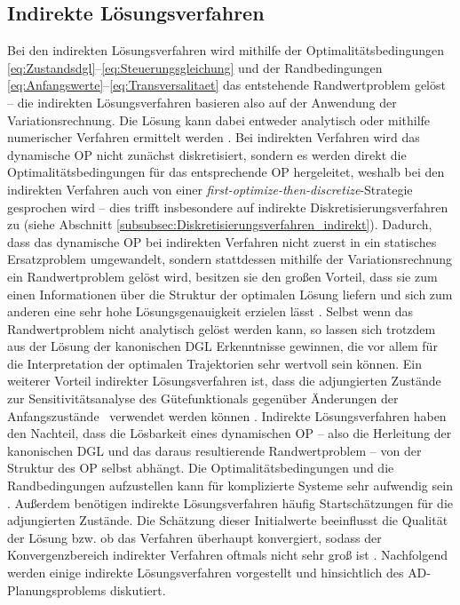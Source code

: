 \subsection{Indirekte Lösungsverfahren}\label{subsec:Indirekt}
Bei den indirekten Lösungsverfahren wird mithilfe der Optimalitätsbedingungen \eqref{eq:Zustandsdgl}--\eqref{eq:Steuerungsgleichung} und der Randbedingungen \eqref{eq:Anfangswerte}--\eqref{eq:Transversalitaet} das entstehende Randwertproblem gelöst \cite{Papageorgiou.2012} -- die indirekten Lösungsverfahren basieren also auf der Anwendung der Variationsrechnung. Die Lösung kann dabei entweder analytisch oder mithilfe numerischer Verfahren ermittelt werden \cite{Gerdts.2010}. Bei indirekten Verfahren wird das dynamische \gls{OP} nicht zunächst diskretisiert, sondern es werden direkt die Optimalitätsbedingungen für das entsprechende \gls{OP} hergeleitet, weshalb bei den indirekten Verfahren auch von einer \glqq\textit{first-optimize-then-discretize\grqq}-Strategie gesprochen wird \cite{Papageorgiou.2012} -- dies trifft insbesondere auf indirekte Diskretisierungsverfahren zu (siehe Abschnitt \ref{subsubsec:Diskretisierungsverfahren_indirekt}). Dadurch, dass das dynamische \gls{OP} bei indirekten Verfahren nicht zuerst in ein statisches Ersatzproblem umgewandelt, sondern stattdessen mithilfe der Variationsrechnung ein Randwertproblem gelöst wird, besitzen sie den großen Vorteil, dass sie zum einen Informationen über die Struktur der optimalen Lösung liefern und sich zum anderen eine sehr hohe Lösungsgenauigkeit erzielen lässt \cite{KnutGraichen.2012}. Selbst wenn das Randwertproblem nicht analytisch gelöst werden kann, so lassen sich trotzdem aus der Lösung der kanonischen \gls{DGL} Erkenntnisse gewinnen, die vor allem für die Interpretation der optimalen Trajektorien sehr wertvoll sein können. Ein weiterer Vorteil indirekter Lösungsverfahren ist, dass die adjungierten Zustände zur Sensitivitätsanalyse des Gütefunktionals gegenüber Änderungen der Anfangszustände \xzero~verwendet werden können \cite{KnutGraichen.2012}. Indirekte Lösungsverfahren haben den Nachteil, dass die Lösbarkeit eines dynamischen \gls{OP} -- also die Herleitung der kanonischen \gls{DGL} und das daraus resultierende Randwertproblem -- von der Struktur des \gls{OP} selbst abhängt. Die Optimalitätsbedingungen und die Randbedingungen aufzustellen kann für komplizierte Systeme sehr aufwendig sein \cite{Papageorgiou.2012}. Außerdem benötigen indirekte Lösungsverfahren häufig Startschätzungen für die adjungierten Zustände. Die Schätzung dieser Initialwerte beeinflusst die Qualität der Lösung bzw. ob das Verfahren überhaupt konvergiert, sodass der Konvergenzbereich indirekter Verfahren oftmals nicht sehr groß ist \cite{Papageorgiou.2012}. Nachfolgend werden einige indirekte Lösungsverfahren vorgestellt und hinsichtlich des \gls{AD}-Planungsproblems diskutiert. 

